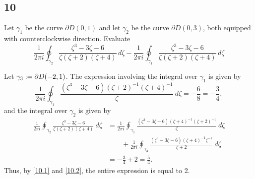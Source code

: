 \documentclass[12pt]{article}
\begin{document}
\subsection*{10}
\begin{tcolorbox}
Let $\gamma_1$ be the curve $\partial D(0,1)$ and let $\gamma_2$ be the curve $\partial
D(0,3)$, both equipped with counterclockwise direction. Evaluate
$$\dfrac{1}{2\pi
i}\oint_{\gamma_2}
\dfrac{\zeta^3-3\zeta-6}{\zeta(\zeta+2)(\zeta+4)}\,d\zeta-\dfrac{1}{2\pi
i}\oint_{\gamma_1}
\dfrac{\zeta^3-3\zeta-6}{\zeta(\zeta+2)(\zeta+4)}\,d\zeta$$
\end{tcolorbox}
Let $\gamma_3 := \partial D(-2,1)$. The expression involving the integral over $\gamma_{1}$ is given by 
\begin{equation}
\frac{1}{2\pi i}\oint_{\gamma_1}\frac{(\zeta^3 - 3\zeta - 6)(\zeta+2)^{-1}(\zeta+4)^{-1}}{\zeta}\ d\zeta = -\frac{6}{8} = -\frac{3}{4}, 
\label{10.1}
\end{equation}
and the integral over $\gamma_{2}$ is given by
\begin{align}
\frac{1}{2\pi i}\oint_{\gamma_2} \frac{\zeta^3 - 3\zeta - 6}{\zeta(\zeta + 2)(\zeta + 4)}\ d\zeta & = \frac{1}{2\pi i}\oint_{\gamma_1}\frac{(\zeta^3 -
3\zeta - 6)(\zeta + 4)^{-1}(\zeta+2)^{-1}}{\zeta}\ d\zeta \nonumber \\ 
& \qquad + \frac{1}{2\pi i}\oint_{\gamma_3}\frac{(\zeta^{3} - 3\zeta - 6)(\zeta+4)^{-1}\zeta^{-1}}{\zeta + 2}\ d\zeta \nonumber \\
& = -\frac{3}{4} + 2 = \frac{5}{4}. \label{10.2}
\end{align}
Thus, by \eqref{10.1} and \eqref{10.2}, the entire expression is equal to 2.
\end{document}
